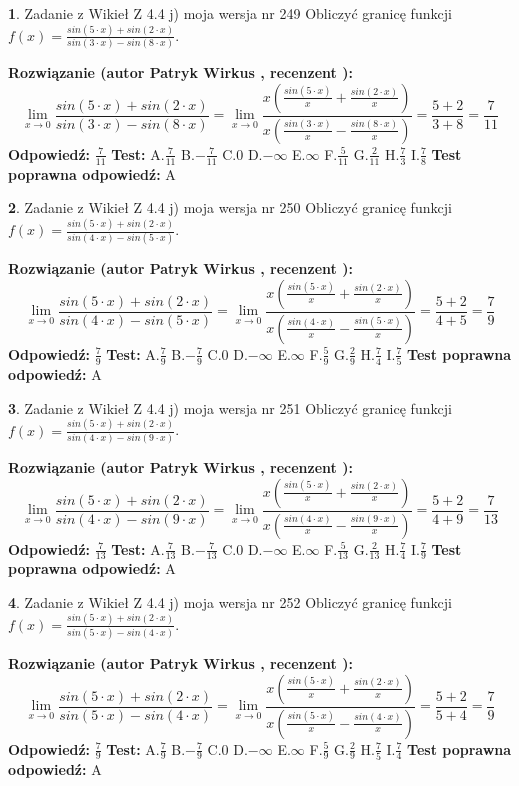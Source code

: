 \documentclass[12pt, a4paper]{article}
\theoremstyle{definition} %
\newtheorem{zad}{}
\newcommand{\zadStart}[1]{\begin{zad}#1\newline}
\newcommand{\zadStop}{\end{zad}}
\newcommand{\rozwStart}[2]{\noindent \textbf{Rozwiązanie (autor #1 , recenzent #2): }\newline}
\newcommand{\rozwStop}{\newline}
\newcommand{\odpStart}{\noindent \textbf{Odpowiedź:}\newline}
\newcommand{\odpStop}{\newline}
\newcommand{\testStart}{\noindent \textbf{Test:}\newline}
\newcommand{\testStop}{\newline}
\newcommand{\kluczStart}{\noindent \textbf{Test poprawna odpowiedź:}\newline}
\newcommand{\kluczStop}{\newline}
\begin{document}
\zadStart{Zadanie z Wikieł Z 4.4 j) moja wersja nr 249}
Obliczyć granicę funkcji $f(x)=\frac{sin(5\cdot x) +sin(2\cdot x)}{sin(3\cdot x) -sin(8\cdot x)}$.
\zadStop
\rozwStart{Patryk Wirkus}{}
$$\lim\limits_{x\to 0}\frac{sin(5\cdot x) +sin(2\cdot x)}{sin(3\cdot x) -sin(8\cdot x)}=\lim\limits_{x\to 0}\frac{x(\frac{sin(5\cdot x)}{x}+\frac{sin(2\cdot x)}{x})}{x(\frac{sin(3\cdot x)}{x}-\frac{sin(8\cdot x)}{x})}=\frac{5+2}{3+8} = \frac{7}{11}$$
\rozwStop
\odpStart
$\frac{7}{11}$
\odpStop
\testStart
A.$\frac{7}{11}$
B.$-\frac{7}{11}$
C.$0$
D.$-\infty$
E.$\infty$
F.$\frac{5}{11}$
G.$\frac{2}{11}$
H.$\frac{7}{3}$
I.$\frac{7}{8}$
\testStop
\kluczStart
A
\kluczStop



\zadStart{Zadanie z Wikieł Z 4.4 j) moja wersja nr 250}
Obliczyć granicę funkcji $f(x)=\frac{sin(5\cdot x) +sin(2\cdot x)}{sin(4\cdot x) -sin(5\cdot x)}$.
\zadStop
\rozwStart{Patryk Wirkus}{}
$$\lim\limits_{x\to 0}\frac{sin(5\cdot x) +sin(2\cdot x)}{sin(4\cdot x) -sin(5\cdot x)}=\lim\limits_{x\to 0}\frac{x(\frac{sin(5\cdot x)}{x}+\frac{sin(2\cdot x)}{x})}{x(\frac{sin(4\cdot x)}{x}-\frac{sin(5\cdot x)}{x})}=\frac{5+2}{4+5} = \frac{7}{9}$$
\rozwStop
\odpStart
$\frac{7}{9}$
\odpStop
\testStart
A.$\frac{7}{9}$
B.$-\frac{7}{9}$
C.$0$
D.$-\infty$
E.$\infty$
F.$\frac{5}{9}$
G.$\frac{2}{9}$
H.$\frac{7}{4}$
I.$\frac{7}{5}$
\testStop
\kluczStart
A
\kluczStop



\zadStart{Zadanie z Wikieł Z 4.4 j) moja wersja nr 251}
Obliczyć granicę funkcji $f(x)=\frac{sin(5\cdot x) +sin(2\cdot x)}{sin(4\cdot x) -sin(9\cdot x)}$.
\zadStop
\rozwStart{Patryk Wirkus}{}
$$\lim\limits_{x\to 0}\frac{sin(5\cdot x) +sin(2\cdot x)}{sin(4\cdot x) -sin(9\cdot x)}=\lim\limits_{x\to 0}\frac{x(\frac{sin(5\cdot x)}{x}+\frac{sin(2\cdot x)}{x})}{x(\frac{sin(4\cdot x)}{x}-\frac{sin(9\cdot x)}{x})}=\frac{5+2}{4+9} = \frac{7}{13}$$
\rozwStop
\odpStart
$\frac{7}{13}$
\odpStop
\testStart
A.$\frac{7}{13}$
B.$-\frac{7}{13}$
C.$0$
D.$-\infty$
E.$\infty$
F.$\frac{5}{13}$
G.$\frac{2}{13}$
H.$\frac{7}{4}$
I.$\frac{7}{9}$
\testStop
\kluczStart
A
\kluczStop



\zadStart{Zadanie z Wikieł Z 4.4 j) moja wersja nr 252}
Obliczyć granicę funkcji $f(x)=\frac{sin(5\cdot x) +sin(2\cdot x)}{sin(5\cdot x) -sin(4\cdot x)}$.
\zadStop
\rozwStart{Patryk Wirkus}{}
$$\lim\limits_{x\to 0}\frac{sin(5\cdot x) +sin(2\cdot x)}{sin(5\cdot x) -sin(4\cdot x)}=\lim\limits_{x\to 0}\frac{x(\frac{sin(5\cdot x)}{x}+\frac{sin(2\cdot x)}{x})}{x(\frac{sin(5\cdot x)}{x}-\frac{sin(4\cdot x)}{x})}=\frac{5+2}{5+4} = \frac{7}{9}$$
\rozwStop
\odpStart
$\frac{7}{9}$
\odpStop
\testStart
A.$\frac{7}{9}$
B.$-\frac{7}{9}$
C.$0$
D.$-\infty$
E.$\infty$
F.$\frac{5}{9}$
G.$\frac{2}{9}$
H.$\frac{7}{5}$
I.$\frac{7}{4}$
\testStop
\kluczStart
A
\kluczStop
\end{document}
